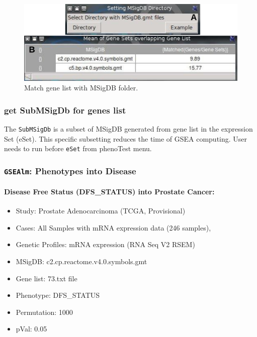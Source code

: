 \documentclass[a4paper]{article}
\begin{document}
\begin{figure}[!ht]
  \centering
 \includegraphics[scale=1]{image/whichMSigDB.png}
 \caption{Match gene list with MSigDB folder.}
 \label{whichMSigDB}
 \end{figure}
 
 
 
\subsubsection{get SubMSigDb for genes list}
The \texttt{SubMSigDb} is a subset of MSigDB generated from gene list in the expression Set (eSet). This specific subsetting reduces the time of GSEA computing. User needs  to run before  \texttt{eSet} from phenoTest menu.



\subsubsection{\texttt{GSEAlm}: Phenotypes into Disease}

\paragraph{Disease Free Status (DFS\_STATUS) into Prostate Cancer:}

\begin{itemize}
    \item Study: Prostate Adenocarcinoma (TCGA, Provisional) 
    \item Cases: All Samples with mRNA expression data (246 samples),
    \item Genetic Profiles: mRNA expression (RNA Seq V2 RSEM)
    \item MSigDB: c2.cp.reactome.v4.0.symbols.gmt
    \item Gene list: 73.txt file
    \item Phenotype: DFS\_STATUS
    \item Permutation: 1000
    \item pVal: 0.05
 \end{itemize}
 
\end{document}
